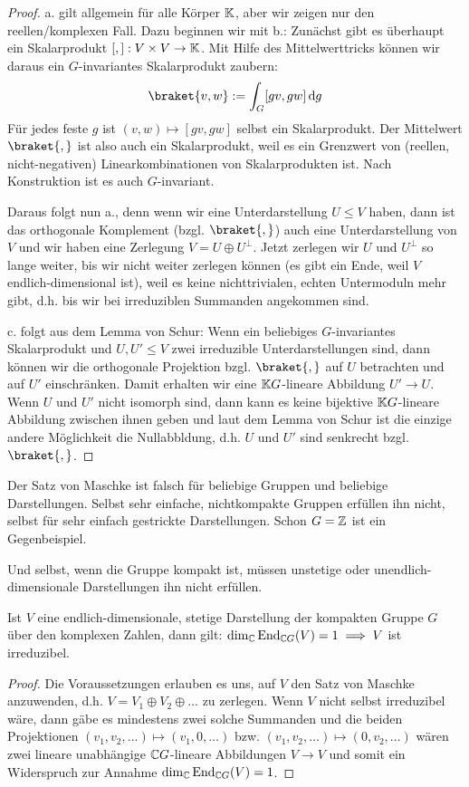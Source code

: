 \begin{proof}
a. gilt allgemein für alle Körper $\mathbb{K}$, aber wir zeigen nur den reellen/komplexen Fall. Dazu beginnen wir mit b.: Zunächst gibt es überhaupt ein Skalarprodukt $[,]: V\times V\to\mathbb{K}$. Mit Hilfe des Mittelwerttricks können wir daraus ein $G$-invariantes Skalarprodukt zaubern:
\[\braket{v,w} := \int_G [gv,gw] \,\textrm{d}g\]
Für jedes feste $g$ ist $(v,w) \mapsto [gv,gw]$ selbst ein Skalarprodukt. Der Mittelwert $\braket{,}$ ist also auch ein Skalarprodukt, weil es ein Grenzwert von (reellen, nicht-negativen) Linearkombinationen von Skalarprodukten ist. Nach Konstruktion ist es auch $G$-invariant.

\smallbreak
Daraus folgt nun a., denn wenn wir eine Unterdarstellung $U\leq V$ haben, dann ist das orthogonale Komplement (bzgl. $\braket{,}$) auch eine Unterdarstellung von $V$ und wir haben eine Zerlegung $V=U\oplus U^\perp$. Jetzt zerlegen wir $U$ und $U^\perp$ so lange weiter, bis wir nicht weiter zerlegen können (es gibt ein Ende, weil $V$ endlich-dimensional ist), weil es keine nichttrivialen, echten Untermoduln mehr gibt, d.h. bis wir bei irreduziblen Summanden angekommen sind.

\smallbreak
c. folgt aus dem Lemma von Schur: Wenn ein beliebiges $G$-invariantes Skalarprodukt und $U,U'\leq V$ zwei irreduzible Unterdarstellungen sind, dann können wir die orthogonale Projektion bzgl. $\braket{,}$ auf $U$ betrachten und auf $U'$ einschränken. Damit erhalten wir eine $\mathbb{K} G$-lineare Abbildung $U'\to U$. Wenn $U$ und $U'$ nicht isomorph sind, dann kann es keine bijektive $\mathbb{K} G$-lineare Abbildung zwischen ihnen geben und laut dem Lemma von Schur ist die einzige andere Möglichkeit die Nullabbldung, d.h. $U$ und $U'$ sind senkrecht bzgl. $\braket{,}$.
\end{proof}

\begin{remark}
Der Satz von Maschke ist falsch für beliebige Gruppen und beliebige Darstellungen. Selbst sehr einfache, nichtkompakte Gruppen erfüllen ihn nicht, selbst für sehr einfach gestrickte Darstellungen. Schon $G=\mathbb{Z}$ ist ein Gegenbeispiel.

Und selbst, wenn die Gruppe kompakt ist, müssen unstetige oder unendlich-dimensionale Darstellungen ihn nicht erfüllen.
\end{remark}

\begin{corollary}
Ist $V$ eine endlich-dimensionale, stetige Darstellung der kompakten Gruppe $G$ über den komplexen Zahlen, dann gilt: $\dim_{\mathbb{C}} \operatorname{End}_{\mathbb{C} G}(V) = 1 \implies V$ ist irreduzibel.
\end{corollary}
\begin{proof}
Die Voraussetzungen erlauben es uns, auf $V$ den Satz von Maschke anzuwenden, d.h. $V=V_1\oplus V_2\oplus ...$ zu zerlegen. Wenn $V$ nicht selbst irreduzibel wäre, dann gäbe es mindestens zwei solche Summanden und die beiden Projektionen $(v_1,v_2, ...) \mapsto (v_1,0,\ldots)$ bzw. $(v_1,v_2,\ldots)\mapsto (0,v_2,\ldots)$ wären zwei lineare unabhängige $\mathbb{C} G$-lineare Abbildungen $V\to V$ und somit ein Widerspruch zur Annahme $\dim_{\mathbb{C}} \operatorname{End}_{\mathbb{C} G}(V)=1$.
\end{proof}

